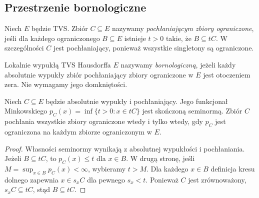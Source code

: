 \subsection{Przestrzenie bornologiczne}

\begin{definicja}
\label{def:bornivorous}
Niech $E$ będzie TVS. Zbiór $C\subseteq E$ nazywamy
\emph{pochłaniającym zbiory ograniczone}, jeśli dla każdego
ograniczonego $B\subseteq E$ istnieje $t>0$ takie, że
$B\subseteq tC$. W szczególności $C$ jest pochłaniający,
ponieważ wszystkie singletony są ograniczone.
\end{definicja}

\begin{definicja}\label{def:bornological}
Lokalnie wypukłą TVS Hausdorffa $E$ nazywamy
\emph{bornologiczną}, jeżeli każdy absolutnie wypukły
zbiór pochłaniający zbiory ograniczone w $E$ jest
otoczeniem zera. Nie wymagamy jego domkniętości.
\end{definicja}

\begin{lemat}
\label{lem:minkowski-bornivorous}
Niech $C\subseteq E$ będzie absolutnie wypukły i
pochłaniający. Jego funkcjonał Minkowskiego
$p_C(x)=\inf\{t>0:x\in tC\}$ jest skończoną seminormą.
Zbiór $C$ pochłania wszystkie zbiory ograniczone wtedy
i tylko wtedy, gdy $p_C$ jest ograniczona na każdym
zbiorze ograniczonym w $E$.
\end{lemat}
\begin{proof}
Własności seminormy wynikają z absolutnej wypukłości i
pochłaniania. Jeżeli $B\subseteq tC$, to $p_C(x)\le t$
dla $x\in B$. W drugą stronę, jeśli
$M=\sup_{x\in B}p_C(x)<\infty$, wybieramy $t>M$.
Dla każdego $x\in B$ definicja kresu dolnego zapewnia
$x\in s_x C$ dla pewnego $s_x<t$. Ponieważ $C$ jest
zrównoważony, $s_xC\subseteq tC$, stąd $B\subseteq tC$.
\end{proof}

